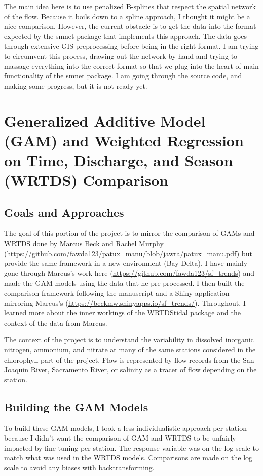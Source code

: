 \documentclass[12pt]{amsart}
\begin{document}
The main idea here is to use penalized B-splines that respect the spatial network of the flow. Because it boils down to a spline approach, I thought it might be a nice comparison. However, the current obstacle is to get the data into the format expected by the smnet package that implements this approach. The data goes through extensive GIS preprocessing before being in the right format. I am trying to circumvent this process, drawing out the network by hand and trying to massage everything into the correct format so that we plug into the heart of main functionality of the smnet package. I am going through the source code, and making some progress, but it is not ready yet.


\section{Generalized Additive Model (GAM) and Weighted Regression on Time, Discharge, and Season (WRTDS) Comparison}

\subsection{Goals and Approaches}
The goal of this portion of the project is to mirror the comparison of GAMs and WRTDS done by Marcus Beck and Rachel Murphy (\url{https://github.com/fawda123/patux_manu/blob/jawra/patux_manu.pdf}) but provide the same framework in a new environment (Bay Delta). I have mainly gone through Marcus's work here (\url{https://github.com/fawda123/sf_trends}) and made the GAM models using the data that he pre-processed. I then built the comparison framework following the manuscript and a Shiny application mirroring Marcus's (\url{https://beckmw.shinyapps.io/sf_trends/}). Throughout, I learned more about the inner workings of the WRTDStidal package and the context of the data from Marcus.

The context of the project is to understand the variability in dissolved inorganic nitrogen, ammonium, and nitrate at many of the same stations considered in the chlorophyll part of the project. Flow is represented by flow records from the San Joaquin River, Sacramento River, or salinity as a tracer of flow depending on the station.

\subsection{Building the GAM Models}

To build these GAM models, I took a less individualistic approach per station because I didn't want the comparison of GAM and WRTDS to be unfairly impacted by fine tuning per station. The response variable was on the log scale to match what was used in the WRTDS models. Comparisons are made on the log scale to avoid any biases with backtransforming.
\end{document}
